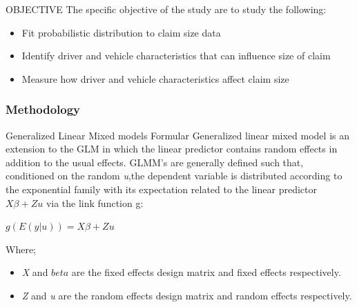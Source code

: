 \documentclass[11pt]{beamer}
\begin{document}
\begin{frame}
	\begin{block}{OBJECTIVE}
The specific objective of the study are to study the following:
\begin{itemize}
\item Fit probabilistic distribution to claim size data
\item Identify driver and vehicle characteristics that can influence size of claim
\item Measure how driver and vehicle characteristics affect claim size
\end{itemize}
	\end{block}
\end{frame}
\begin{frame}
	\frametitle{Methodology}	
	\begin{block}{Generalized Linear Mixed models Formular}
Generalized linear mixed model is an extension to the GLM in which the linear predictor contains random effects in addition to the usual effects. 
	GLMM's are generally defined such that, conditioned on the random \emph{u},the dependent variable is distributed according to the exponential family with its expectation related to the linear predictor $X\beta + Zu$ via  the link function g:\\
				\begin{center}
						$g(E(y|u)) = X\beta + Zu$
				\end{center}
Where; 
\begin{itemize}
	\item   \emph{X} and \emph{$beta$} are the fixed effects design matrix and fixed effects respectively.\\
	\item   \emph{Z} and \emph{u} are the random effects design matrix and random effects respectively.\\ 
\end{itemize}
	\end{block}
\end{frame}
\end{document}
